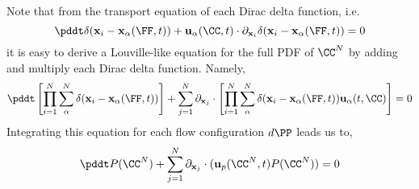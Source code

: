Note that from the transport equation of each Dirac delta function, i.e. 
\begin{equation*}
    \pddt \delta(\textbf{x}_i - \textbf{x}_\alpha(\FF,t))
    + \textbf{u}_\alpha(\CC,t)\cdot\partial_{\textbf{x}_i}\delta(\textbf{x}_i-\textbf{x}_\alpha(\FF,t))
    =0 
\end{equation*}
it is easy to derive a Louville-like equation for the full PDF of $\CC^N$ by adding and multiply each Dirac delta function. 
Namely, 
\begin{equation*}
    \pddt \left[
        \prod_{i=1}^{N}\sum_{\alpha}^{N}\delta(\textbf{x}_i - \textbf{x}_\alpha(\FF,t)) 
    \right]
    + 
    \sum_{j=1}^N \partial_{\textbf{x}_j}\cdot\left[
        \prod_{i=1}^{N}\sum_{\alpha}^{N}\delta(\textbf{x}_i - \textbf{x}_\alpha(\FF,t)) \textbf{u}_\alpha(t,\CC) 
    \right]
    =0 
\end{equation*}
Integrating this equation for each flow configuration $d\PP$ leads us to, 
\begin{equation*}
    \pddt P(\CC^N)
    + 
    \sum_{j=1}^N \partial_{\textbf{x}_j} \cdot
    (\textbf{u}_p(\CC^N,t) P(\CC^N) )
    =0 
\end{equation*}


